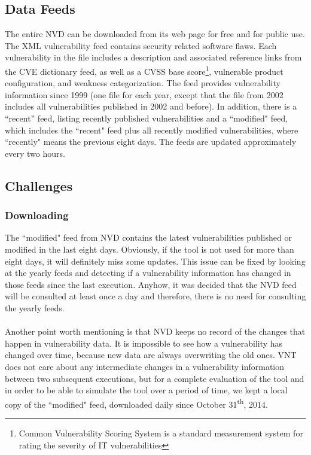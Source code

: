 \subsection{Data Feeds}
The entire NVD can be downloaded from its web page for free and for public use. The XML vulnerability feed contains security related software flaws. Each vulnerability in the file includes a description and associated reference links from the CVE dictionary feed, as well as a CVSS base score\footnote{Common Vulnerability Scoring System is a standard measurement system for rating the severity of IT vulnerabilities}, vulnerable product configuration, and weakness categorization. The feed provides vulnerability information since 1999 (one file for each year, except that the file from 2002 includes all vulnerabilities published in 2002 and before). In addition, there is a ``recent'' feed, listing recently published vulnerabilities and a ``modified" feed, which includes the ``recent" feed plus all recently modified vulnerabilities, where ``recently" means the previous eight days. The feeds are updated approximately every two hours.


\subsection{Challenges}
\subsubsection{Downloading}
The ``modified" feed from NVD contains the latest vulnerabilities published or modified in the last eight days. Obviously, if the tool is not used for more than eight days, it will definitely miss some updates. This issue can be fixed by looking at the yearly feeds and detecting if a vulnerability information has changed in those feeds since the last execution. Anyhow, it was decided that the NVD feed will be consulted at least once a day and therefore, there is no need for consulting the yearly feeds. 
\paragraph{}
Another point worth mentioning is that NVD keeps no record of the changes that happen in vulnerability data. It is impossible to see how a vulnerability has changed over time, because new data are always overwriting the old ones. VNT does not care about any intermediate changes in a vulnerability information between two subsequent executions, but for a complete evaluation of the tool and in order to be able to simulate the tool over a period of time, we kept a local copy of the ``modified" feed, downloaded daily since October 31\textsuperscript{th}, 2014. 
